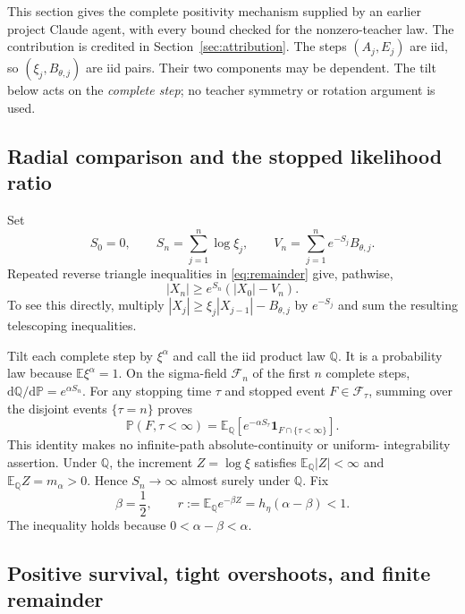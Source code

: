\documentclass[11pt,a4paper]{article}
\numberwithin{equation}{section}
\theoremstyle{remark}
\newcommand{\E}{\mathbb E}
\newcommand{\Pp}{\mathbb P}
\newcommand{\Q}{\mathbb Q}
\newcommand{\ind}{\mathbf 1}
\begin{document}
This section gives the complete positivity mechanism supplied by an earlier
project Claude agent, with every bound checked for the nonzero-teacher law.
The contribution is credited in Section~\ref{sec:attribution}. The steps $(A_j,E_j)$ are iid, so
$(\xi_j,B_{\theta,j})$ are iid pairs. Their two components may be
dependent. The tilt below acts on the \emph{complete step}; no teacher
symmetry or rotation argument is used.

\subsection{Radial comparison and the stopped likelihood ratio}

Set
\begin{equation}
 S_0=0,\qquad S_n=\sum_{j=1}^n\log\xi_j,\qquad
 V_n=\sum_{j=1}^n e^{-S_j}B_{\theta,j}.\label{eq:S-V}
\end{equation}
Repeated reverse triangle inequalities in \eqref{eq:remainder} give,
pathwise,
\begin{equation}
 |X_n|\ge e^{S_n}(|X_0|-V_n).\label{eq:radial-lower}
\end{equation}
To see this directly, multiply
$|X_j|\ge\xi_j|X_{j-1}|-B_{\theta,j}$ by $e^{-S_j}$ and sum the
resulting telescoping inequalities.

Tilt each complete step by $\xi^\alpha$ and call the iid product law
$\Q$. It is a probability law because $\E\xi^\alpha=1$.
On the sigma-field $\mathcal F_n$ of the first $n$ complete steps,
$\mathrm d\Q/\mathrm d\Pp=e^{\alpha S_n}$. For any stopping time $\tau$
and stopped event $F\in\mathcal F_\tau$, summing over the disjoint
events $\{\tau=n\}$ proves
\begin{equation}
 \Pp(F,\tau<\infty)
 =\E_\Q\!\left[e^{-\alpha S_\tau}
                    \ind_{F\cap\{\tau<\infty\}}\right].
 \label{eq:stopped-change}
\end{equation}
This identity makes no infinite-path absolute-continuity or uniform-
integrability assertion. Under $\Q$, the increment $Z=\log\xi$ satisfies
$\E_\Q|Z|<\infty$ and $\E_\Q Z=m_\alpha>0$. Hence
$S_n\to\infty$ almost surely under $\Q$. Fix
\begin{equation}
 \beta=\frac12,\qquad
 r:=\E_\Q e^{-\beta Z}=h_\eta(\alpha-\beta)<1.
 \label{eq:r-tilt}
\end{equation}
The inequality holds because $0<\alpha-\beta<\alpha$.

\subsection{Positive survival, tight overshoots, and finite remainder}
\end{document}
